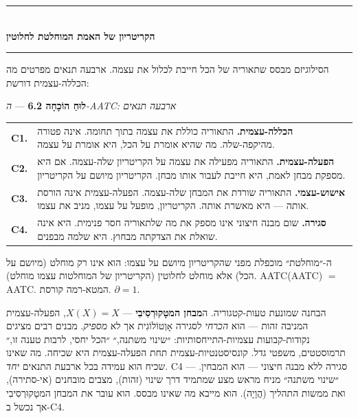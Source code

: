 \documentclass[10pt, openany, oneside]{book}
\renewcommand{\normalsize}{\fontsize{10}{13}\selectfont}
\renewcommand{\footnotesize}{\fontsize{8.5}{11}\selectfont}
\begin{document}
\vspace{1.5em}


\begin{center}
    \rule{0.3\textwidth}{0.4pt}\\[0.5em]
    {\normalsize\bfseries\textsc{הקריטריון של האמת המוחלטת לחלוטין}}\\[0.3em]
    \rule{0.3\textwidth}{0.4pt}
\end{center}

\vspace{1em}

\noindent הסילוגיזם מבסס שתאוריה של הכל חייבת לכלול את עצמה. ארבעה תנאים מפרטים מה הכללה-עצמית דורשת:

\vspace{0.5em}

\textbf{לוּחַ הוֹכָחָה 6.2} --- \textit{ה-AATC: ארבעה תנאים}

\vspace{0.5em}

{\footnotesize
\noindent\begin{tabular}{r p{}}
\textbf{C1.} & \textbf{הכללה-עצמית.} התאוריה כוללת את עצמה בתוך תחומה. אינה פטורה מהיקפה-שלה. מה שהיא אומרת על הכל, היא אומרת על עצמה. \\[0.3em]
\textbf{C2.} & \textbf{הפעלה-עצמית.} התאוריה מפעילה את עצמה על הקריטריון שלה-עצמה. אם היא מספקת מבחן לאמת, היא חייבת לעבור אותו מבחן. הקריטריון מיושם על הקריטריון. \\[0.3em]
\textbf{C3.} & \textbf{אישוש-עצמי.} התאוריה שורדת את המבחן שלה-עצמה. הפעלה-עצמית אינה הורסת אותה — היא מאשרת אותה. הקריטריון, מופעל על עצמו, מניב את עצמו. \\[0.3em]
\textbf{C4.} & \textbf{סגירה.} שום מבנה חיצוני אינו מספק את מה שלתאוריה חסר פנימית. היא אינה שואלת את הצדקתה מבחוץ. היא שלמה מבפנים. \\[0.3em]
\end{tabular}
}

\vspace{0.8em}

\noindent ה-״מוחלטת״ מוכפלת מפני שהקריטריון מיושם על עצמו: הוא אינו רק מוחלט (מיושם על הכל) אלא מוחלט לחלוטין (הקריטריון של המוחלטות עצמו מוחלט). AATC(AATC) $=$ AATC. המטא-רמה קורסת. $\partial = 1$.

הבחנה שמונעת טעות-קטגוריה. ה\textbf{מבחן המטָקוּרְסִיבִי} — $X(X) = X$, הפעלה-עצמית המניבה זהות — הוא \textit{הכרחי} לסגירה אָוְטוֹלוֹגִית אך לא \textit{מספיק}. מבנים רבים מציגים נקודות-קבועות עצמיות-התייחסותיות: ״שינוי משתנה,״ ״הכל יחסי, לרבות טענה זו,״ תרמוסטטים, משפטי גדל. קונסיסטנטיות-עצמית תחת הפעלה-עצמית היא שכיחה. מה שאינו שכיח הוא עמידה בכל ארבעת התנאים \textit{יחד}. C4 — סגירה ללא מבנה חיצוני — הוא המבחין. ״שינוי משתנה״ מניח מראש מצע שמתמיד דרך שינוי (זהות), מצבים מובחנים (אי-סתירה), ואת ממשות התהליך (הֲוָיָה). הוא מייבא מה שאינו מבסס. הוא עובר את המבחן המטָקוּרְסִיבִי אך נכשל ב-C4.
\end{document}
